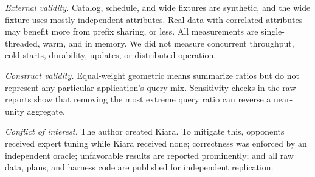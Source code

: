 \emph{External validity.} Catalog, schedule, and wide fixtures are synthetic, and the wide fixture uses mostly independent attributes. Real data with correlated attributes may benefit more from prefix sharing, or less. All measurements are single-threaded, warm, and in memory. We did not measure concurrent throughput, cold starts, durability, updates, or distributed operation.

\emph{Construct validity.} Equal-weight geometric means summarize ratios but do not represent any particular application's query mix. Sensitivity checks in the raw reports show that removing the most extreme query ratio can reverse a near-unity aggregate.

\emph{Conflict of interest.} The author created Kiara. To mitigate this, opponents received expert tuning while Kiara received none; correctness was enforced by an independent oracle; unfavorable results are reported prominently; and all raw data, plans, and harness code are published for independent replication.

